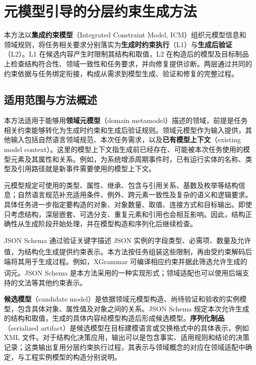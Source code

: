 \documentclass[pdflatex,iicol,sn-mathphys-num]{sn-jnl}
\newcommand{\paperref}[1]{\textsuperscript{\textcolor{citationred}{\citep{#1}}}}
\begin{document}
\FloatBarrier

\section{元模型引导的分层约束生成方法}\label{sec:method}

本方法以\textbf{集成约束模型}（Integrated Constraint Model, ICM）组织元模型信息和领域规则，将任务相关要求分别落实为\textbf{生成时约束执行}（L1）与\textbf{生成后验证}（L2）。L1 在候选内容产生时限制其结构和取值，L2 在构造后的模型及目标制品上检查结构符合性、领域一致性和任务要求，并向修复提供诊断。两层通过共同的约束依据与任务绑定衔接，构成从需求到模型生成、验证和修复的完整过程。


\subsection{适用范围与方法概述}\label{sec:method-3-1}

本方法适用于能够用\textbf{领域元模型}（domain metamodel）描述的领域，前提是任务相关约束能够转化为生成时约束和生成后验证规则。领域元模型作为输入提供，其他输入包括自然语言领域规范、本次任务需求，以及\textbf{已有模型上下文}（existing model context）。这里的模型上下文指生成前已经存在、可能被本次任务使用的模型元素及其属性和关系。例如，为系统增添周期事件时，已有运行实体的名称、类型及引用路径就是新事件需要使用的模型上下文。


元模型规定可使用的类型、属性、继承、包含与引用关系、基数及枚举等结构信息；自然语言规范补充适用条件、例外、跨元素一致性及复杂的语义和逻辑要求。具体任务进一步指定要构造的对象、对象数量、取值、连接方式和目标输出。即使只考虑结构，深层嵌套、可选分支、重复元素和引用也会相互影响。因此，结构正确性从生成阶段开始处理，并在模型构造和序列化后继续检查。


JSON Schema 通过验证关键字描述 JSON 实例的字段类型、必需项、数量及允许值，为结构化生成提供约束表示\paperref{bhutton-json-schema-validation-01}。本方法按任务组装这些限制，再由受约束解码后端将其用于生成过程。例如，XGrammar 可编译相应约束并据此筛选允许生成的词元\paperref{MLSYS2025_5c20ca4b}。JSON Schema 是本方法采用的一种实现形式；领域适配也可以使用后端支持的文法等其他约束表示。


\textbf{候选模型}（candidate model）是依据领域元模型构造、尚待验证和验收的实例模型，包含具体对象、属性值及对象之间的关系。JSON Schema 规定本次允许生成的结构和取值，生成的具体内容经模型构造后形成候选模型。\textbf{序列化制品}（serialized artifact）是候选模型在目标建模语言或交换格式中的具体表示，例如 XML 文件。对于结构化决策应用，输出可以是包含事实、适用规则和结论的决策记录；这类输出复用分层约束执行过程，其表示与领域概念的对应在领域适配中确定，与工程实例模型的构造分别说明。
\end{document}

